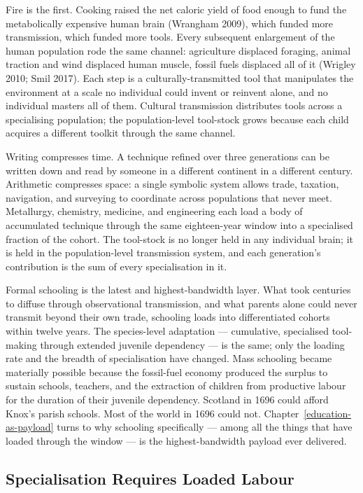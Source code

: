 \documentclass[12pt,letterpaper]{article}
\begin{document}
Fire is the first. Cooking raised the net caloric yield of food
enough to fund the metabolically expensive human brain (Wrangham
2009), which funded more transmission, which funded more tools. Every
subsequent enlargement of the human population rode the same channel:
agriculture displaced foraging, animal traction and wind displaced
human muscle, fossil fuels displaced all of it (Wrigley 2010; Smil
2017). Each step is a culturally-transmitted tool that manipulates
the environment at a scale no individual could invent or reinvent
alone, and no individual masters all of them. Cultural transmission
distributes tools across a specialising population; the
population-level tool-stock grows because each child acquires a
different toolkit through the same channel.

Writing compresses time. A technique refined over three generations
can be written down and read by someone in a different continent in a
different century. Arithmetic compresses space: a single symbolic
system allows trade, taxation, navigation, and surveying to
coordinate across populations that never meet. Metallurgy, chemistry,
medicine, and engineering each load a body of accumulated technique
through the same eighteen-year window into a specialised fraction of
the cohort. The tool-stock is no longer held in any individual brain;
it is held in the population-level transmission system, and each
generation's contribution is the sum of every specialisation in it.

Formal schooling is the latest and highest-bandwidth layer. What took
centuries to diffuse through observational transmission, and what
parents alone could never transmit beyond their own trade, schooling
loads into differentiated cohorts within twelve years. The
species-level adaptation --- cumulative, specialised tool-making
through extended juvenile dependency --- is the same; only the
loading rate and the breadth of specialisation have changed. Mass
schooling became materially possible because the fossil-fuel economy
produced the surplus to sustain schools, teachers, and the extraction
of children from productive labour for the duration of their
juvenile dependency. Scotland in 1696 could afford Knox's parish
schools. Most of the world in 1696 could not. Chapter~\ref{education-as-payload}
turns to why schooling specifically --- among all the things that
have loaded through the window --- is the highest-bandwidth payload
ever delivered.

\subsection{Specialisation Requires Loaded Labour}\label{specialisation-requires-loaded-labour}
\end{document}
